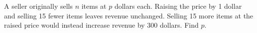 A seller originally sells $n$ items at $p$ dollars each. Raising the price by 1 dollar and selling 15 fewer items leaves revenue unchanged. Selling 15 more items at the raised price would instead increase revenue by 300 dollars. Find $p$.

